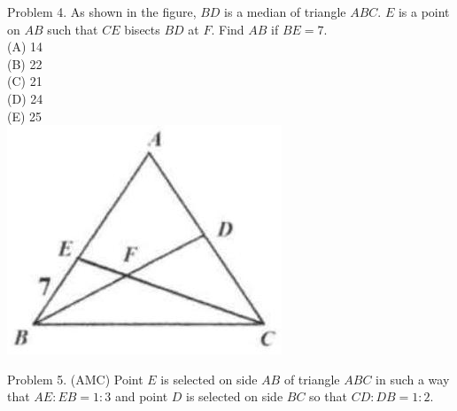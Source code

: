 \documentclass[10pt]{article}
\begin{document}
Problem 4. As shown in the figure, \(B D\) is a median of triangle \(A B C\). \(E\) is a point on \(A B\) such that \(C E\) bisects \(B D\) at \(F\). Find \(A B\) if \(B E=7\).\\
(A) 14\\
(B) 22\\
(C) 21\\
(D) 24\\
(E) 25\\
\includegraphics[max width=\textwidth, center]{2025_04_17_97bc1f7e44d93c271a88g-126(1)}

Problem 5. (AMC) Point \(E\) is selected on side \(A B\) of triangle \(A B C\) in such a way that \(A E: E B=1: 3\) and point \(D\) is selected on side \(B C\) so that \(C D: D B=1: 2\).
\end{document}
